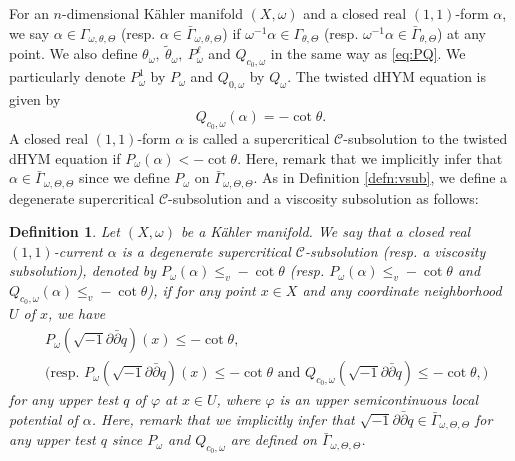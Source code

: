\documentclass[10pt,a4paper]{amsart}
\numberwithin{equation}{section}
\newtheorem{defn}[equation]{Definition}
\newcommand{\delb}{\sqrt{-1}\partial\bar{\partial}}
\begin{document}
For an $n$-dimensional Kähler manifold $(X,\omega)$ and a closed real $(1,1)$-form $\alpha$, we say $\alpha\in{\Gamma}_{\omega,\theta,\Theta}$ (resp. $\alpha\in\bar{\Gamma}_{\omega,\theta,\Theta}$)  if $\omega^{-1}\alpha\in{\Gamma}_{\theta,\Theta}$ (resp. $\omega^{-1}\alpha\in\bar{\Gamma}_{\theta,\Theta}$) at any point. We also define
$\theta_\omega,\ \tilde{\theta}_\omega,\ P^\ell_\omega$ and $Q_{c_0,\omega}$ in the same way as \eqref{eq:PQ}. We particularly denote $P^1_\omega$ by $P_\omega$ and $Q_{0,\omega}$ by $Q_\omega$. The twisted dHYM equation is given by
\begin{equation}\label{eq:tdHYMop}
    Q_{c_0,\omega}(\alpha)=-\cot\theta.
\end{equation}
A closed real $(1,1)$-form $\alpha$ is called a supercritical $\mathcal{C}$-subsolution to the twisted dHYM equation if $P_\omega(\alpha)<-\cot\theta$. Here, remark that we implicitly infer that $\alpha\in\bar{\Gamma}_{\omega,\Theta,\Theta}$ since we define $P_\omega$ on $\bar{\Gamma}_{\omega,\Theta,\Theta}$.
As in Definition \ref{defn:vsub}, we define a degenerate supercritical $\mathcal{C}$-subsolution and a viscosity subsolution as follows:

\begin{defn}\label{defn:dhymvsub}
    Let $(X,\omega)$ be a K{\"a}hler manifold. 
    We say that a closed real $(1,1)$-current $\alpha$ is a degenerate supercritical $\mathcal{C}$-subsolution (resp. a viscosity subsolution), denoted by $P_\omega(\alpha)\le_v-\cot\theta$ (resp. $P_\omega(\alpha)\le_v-\cot\theta$ and $Q_{c_0,\omega}(\alpha)\le_v-\cot\theta$), if for any point $x\in X$ and any coordinate neighborhood $U$ of $x$, we have  
    \begin{align*}
        &P_\omega(\delb q)(x)\le -\cot\theta, \\
        &\bigg( \text{resp. } P_\omega(\delb q)(x)\le -\cot\theta \text{ and } Q_{c_0,\omega}(\delb q)\le-\cot\theta,\bigg)
    \end{align*}
    for any upper test $q$ of $\varphi$ at $x \in U$, where $\varphi$ is an upper semicontinuous local potential of $\alpha$. Here, remark that we implicitly infer that $\delb q\in\bar{\Gamma}_{\omega,\Theta,\Theta}$ for any upper test $q$ since $P_\omega$ and $Q_{c_0,\omega}$ are defined on $\bar{\Gamma}_{\omega,\Theta,\Theta}$. 
\end{defn}
\end{document}
